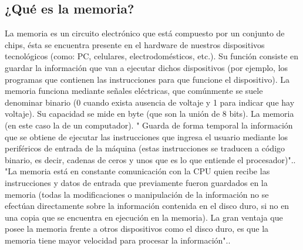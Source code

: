 \documentclass{article}
\begin{document}
\subsection{¿Qué es la memoria?} \label{contenido}
La memoria es un circuito electrónico que está compuesto por un conjunto de chips, ésta se encuentra presente en el hardware de nuestros dispositivos tecnológicos (como: PC, celulares, electrodomésticos, etc.). Su función consiste en guardar la información que van a ejecutar dichos dispositivos (por ejemplo, los programas que contienen las instrucciones para que funcione el dispositivo).
\newline
La memoria funciona mediante señales eléctricas, que comúnmente se suele denominar binario (0 cuando exista ausencia de voltaje y 1 para indicar que hay voltaje). Su capacidad se mide en byte (que son la unión de 8 bits). La memoria (en este caso la de un computador). " Guarda de forma temporal la información que se obtiene de ejecutar las instrucciones que ingresa el usuario mediante los periféricos de entrada de la máquina (estas instrucciones se traducen a código binario, es decir, cadenas de ceros y unos que es lo que entiende el procesador)".\cite{Quiroga}.
\newline
"La memoria está en constante comunicación con la CPU quien recibe las instrucciones y datos de entrada que previamente fueron guardados en la memoria (todas la modificaciones o manipulación de la información no se efectúan directamente sobre la información contenida en el disco duro, si no en una copia que se encuentra en ejecución en la memoria). La gran ventaja que posee la memoria frente a otros dispositivos como el disco duro, es que la memoria tiene mayor velocidad para procesar la información".\cite{Guia}.
\end{document}
